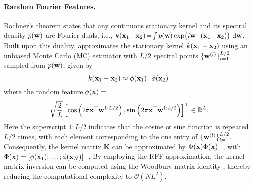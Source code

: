 \vspace{-0.05in}
\paragraph{Random Fourier Features.}
Bochner's theorem  \citep{bochner1959lectures} states that any continuous stationary kernel and its spectral density $p({\mathbf w})$ are Fourier duals, i.e., \( k(\x_1\!-\!\x_2)\!=\!\int p(\w) \exp \! \left({i \w^{\top} (\x_1\!-\!\x_2)}\right)\!\mathrm{~d} \w \). Built upon this duality, \citet{rahimi2008random} approximates the stationary kernel \( k({\mathbf x}_1 - {\mathbf x}_2) \) using an unbiased \MakeUppercase{m}onte \MakeUppercase{c}arlo (\MakeUppercase{mc}) estimator with \( L/2 \) spectral points \( \{{\mathbf w}^{(l)}\}_{l=1}^{L/2} \) sampled from \( p({\mathbf w}) \), given by
\begin{equation}
    k({\mathbf x}_1 - {\mathbf x}_2) \approx \phi({\mathbf x}_1)^{\top} \phi({\mathbf x}_2),
    \label{eq:basic_rff}
\end{equation}
where the random feature \( \phi({\mathbf x}) = \)
\begin{equation}
    \sqrt{\frac{2}{L}} \left[\cos \left(2\pi {\mathbf x}^{\top} {\mathbf w}^{1:L/2} \right), \sin \left(2 \pi {\mathbf x}^{\top} {\mathbf w}^{1:L/2} \right)\right]^{\top} \in \mathbb{R}^{L}.
    \nonumber
\end{equation}
Here the superscript $1:L/2$ indicates that the cosine or sine function is repeated $L/2$ times, with each element corresponding to the one entry of  \( \{{\mathbf w}^{(l)}\}_{l=1}^{L/2} \). 
Consequently, the kernel matrix \( \mathbf{K} \) can be approximated by \( \Phi({\mathbf x}) \Phi({\mathbf x})^{\top} \), with \( \Phi({\mathbf x}) = \left[\phi({\mathbf x}_1); \ldots; \phi({\mathbf x}_N)\right]^{\top} \). By employing the RFF approximation, the kernel matrix inversion can be computed using the Woodbury matrix identity \citep{woodbury1950inverting}, thereby reducing the computational complexity to $\mathcal{O}(NL^2)$. 





